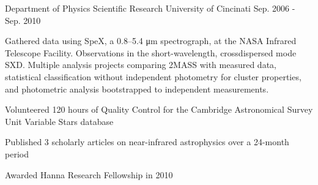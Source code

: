 \begin{cventries}
  \cventry
    {Department of Physics} %
    {Scientific Research} %
    {University of Cincinati} %
    {Sep. 2006 - Sep. 2010} %
    {
      \begin{cvparagraph}
        Gathered data using SpeX, a 0.8–5.4 μm spectrograph, at the NASA Infrared Telescope Facility.  Observations in the short-wavelength, crossdispersed mode SXD.  Multiple analysis projects comparing 2MASS with measured data, statistical classification without independent photometry for cluster properties, and photometric analysis bootstrapped to independent measurements.
      \end{cvparagraph}
      \begin{cvitems} %
        \item {Volunteered 120 hours of Quality Control for the Cambridge Astronomical Survey Unit Variable Stars database}
        \item {Published 3 scholarly articles on near-infrared astrophysics over a 24-month period}
        \item {Awarded Hanna Research Fellowship in 2010}
      \end{cvitems}
    }

\end{cventries}
